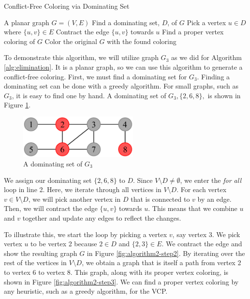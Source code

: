 \documentclass{sig-alternate}
\begin{document}
\begin{algorithm}
\caption{Conflict-Free Coloring via Dominating Set} \label{alg:cf-dominating}
\begin{algorithmic}[1]
\Input A planar graph $G = (V, E)$
\State Find a dominating set, $D$, of $G$
	\State Pick a vertex $u \in D$ where $\{u, v\} \in E$
	\State Contract the edge $\{u,v\}$ towards $u$
\EndFor
\State Find a proper vertex coloring of $G$
\State Color the original $G$ with the found coloring
\end{algorithmic}
\end{algorithm}

To demonstrate this algorithm, we will utilize graph $G_3$ as we did for Algorithm \ref{alg:elimination}. It is a planar graph, so we can use this algorithm to generate a conflict-free coloring. First, we must find a dominating set for $G_3$. Finding a dominating set can be done with a greedy algorithm. For small graphs, such as $G_3$, it is easy to find one by hand. A dominating set of $G_3, \{2, 6, 8\},$ is shown in Figure \ref{fig:algorithm2-step1}.

\begin{figure}[h]
	\centering
	\includegraphics[width=6cm]{../figures/algorithm2-step1.pdf}
	\caption{A dominating set of $G_3$}\label{fig:algorithm2-step1}
\end{figure}

We assign our dominating set $\{2,6,8\}$ to $D$. Since $V \setminus D \neq \emptyset$, we enter the \emph{for all} loop in line 2. Here, we iterate through all vertices in $V \setminus D$. For each vertex $v \in V \setminus D$, we will pick another vertex in $D$ that is connected to $v$ by an edge. Then, we will contract the edge $\{u, v\}$ towards $u$. This means that we combine $u$ and $v$ together and update any edges to reflect the changes.

To illustrate this, we start the loop by picking a vertex $v$, say vertex 3. We pick vertex $u$ to be vertex 2 because $2 \in D$ and $\{2, 3\} \in E$. We contract the edge and show the resulting graph $G$ in Figure \ref{fig:algorithm2-step2}. By iterating over the rest of the vertices in $V \setminus D$, we obtain a graph that is itself a path from vertex 2 to vertex 6 to vertex 8. This graph, along with its proper vertex coloring, is shown in Figure \ref{fig:algorithm2-step3}. We can find a proper vertex coloring by any heuristic, such as a greedy algorithm, for the VCP.
\end{document}
